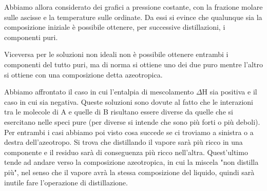 Abbiamo allora considerato dei grafici a pressione costante, con la frazione molare sulle ascisse e la temperature sulle ordinate. Da essi si evince che qualunque sia la composizione iniziale è possibile ottenere, per successive distillazioni, i componenti puri.

Viceversa per le soluzioni non ideali non è possibile ottenere entrambi i componenti del tutto puri, ma di norma si ottiene uno dei due puro mentre l'altro si ottiene con una composizione detta azeotropica.

Abbiamo affrontato il caso in cui l'entalpia di mescolamento $\Delta$H sia positiva e il caso in cui sia negativa. Queste soluzioni sono dovute al fatto che le interazioni tra le molecole di A e quelle di B risultano essere diverse da quelle che si esercitano nelle speci pure (per diverse si intende che sono più forti o più deboli). Per entrambi i casi abbiamo poi visto cosa succede se ci troviamo a sinistra o a destra dell'azeotropo. Si trova che distillando il vapore sarà più ricco in una componente e il residuo sarà di conseguenza più ricco nell'altra. Quest'ultimo tende ad andare verso la composizione azeotropica, in cui la miscela "non distilla più", nel senso che il vapore avrà la stessa composizione del liquido, quindi sarà inutile fare l'operazione di distillazione.